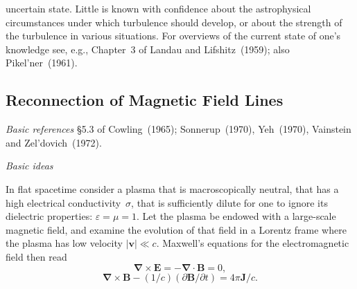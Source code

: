 %


uncertain state. Little is known with confidence about the astrophysical
circumstances under which turbulence should develop, or about the strength
of the turbulence in various situations. For overviews of the current state of
one's knowledge see, e.g., Chapter~3 of Landau and Lifshitz~(1959); also
Pikel'ner~(1961)\cite{Pikelner1961}.


\subsection{Reconnection of Magnetic Field Lines}
\label{sec:2.9}

\textit{Basic references}\quad
\S5.3 of Cowling~(1965)\cite{Cowling1965};
Sonnerup~(1970)\cite{Sonnerup1970},
Yeh~(1970)\cite{Yeh1970},
Vainstein and Zel'dovich~(1972)\cite{VainsteinZeldovich1972}.

\bigskip\noindent
\textit{Basic ideas}

\medskip\noindent
In flat spacetime consider a plasma that is macroscopically neutral, that has a
high electrical conductivity~$\sigma$, that is sufficiently dilute for one to ignore its
dielectric properties: $\varepsilon = \mu = 1$.  Let the plasma be endowed with a large-scale
magnetic field, and examine the evolution of that field in a Lorentz frame where
the plasma has low velocity $|\mathbf{v}|\ll c$.  Maxwell's equations for the electromagnetic
field then read
%
\begin{equation}
\boldsymbol{\nabla}\times\mathbf{E} = -\boldsymbol{\nabla}\cdot\mathbf{B} = 0,
\tag{2.9.1}
\end{equation}
%
\begin{equation}
\boldsymbol{\nabla}\times\mathbf{B} - (1/c)(\partial\mathbf{B}/\partial t) = 4\pi\mathbf{J}/c.
\tag{2.9.2}
\end{equation}

